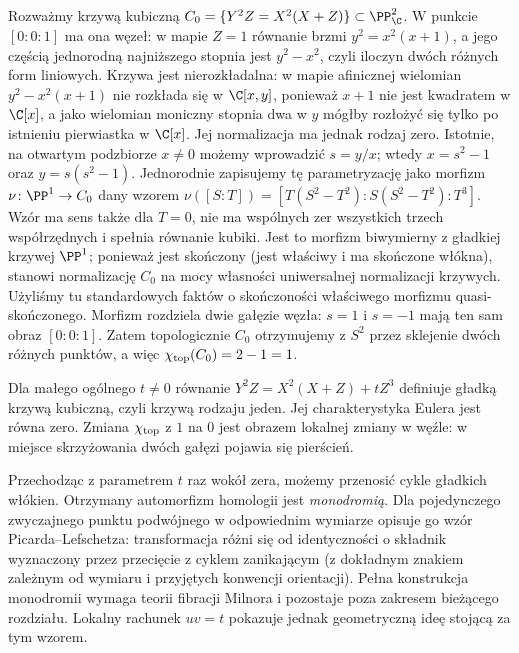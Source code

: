 \begin{przyklad}
Rozważmy krzywą kubiczną
$C_0=\{Y^2Z=X^2(X+Z)\}\subset\PP^2_\C$.
W punkcie $[0:0:1]$ ma ona węzeł: w mapie $Z=1$
równanie brzmi $y^2=x^2(x+1)$, a jego częścią
jednorodną najniższego stopnia jest $y^2-x^2$,
czyli iloczyn dwóch różnych form liniowych.
Krzywa jest nierozkładalna: w mapie afinicznej wielomian
$y^2-x^2(x+1)$ nie rozkłada się w $\C[x,y]$, ponieważ
$x+1$ nie jest kwadratem w $\C[x]$, a jako wielomian
moniczny stopnia dwa w $y$ mógłby rozłożyć się tylko
po istnieniu pierwiastka w $\C[x]$.
Jej normalizacja ma jednak rodzaj zero. Istotnie, na otwartym podzbiorze
$x\ne0$ możemy wprowadzić $s=y/x$; wtedy
$x=s^2-1$ oraz $y=s(s^2-1)$.
Jednorodnie zapisujemy tę parametryzację jako morfizm
$\nu\colon\PP^1\to C_0$ dany wzorem
$\nu([S:T])=[T(S^2-T^2):S(S^2-T^2):T^3]$.
Wzór ma sens także dla $T=0$, nie ma wspólnych zer wszystkich
trzech współrzędnych i spełnia równanie kubiki.
Jest to morfizm biwymierny z gładkiej krzywej $\PP^1$;
ponieważ jest skończony (jest właściwy i ma skończone włókna),
stanowi normalizację $C_0$ na mocy własności uniwersalnej
normalizacji krzywych. Użyliśmy tu standardowych faktów
o skończoności właściwego morfizmu quasi-skończonego.
Morfizm rozdziela dwie gałęzie węzła:
$s=1$ i $s=-1$ mają ten sam obraz $[0:0:1]$.
Zatem topologicznie $C_0$ otrzymujemy z $S^2$
przez sklejenie dwóch różnych punktów, a więc
$\chi_{\rm top}(C_0)=2-1=1$.

Dla małego ogólnego $t\ne0$ równanie
$Y^2Z=X^2(X+Z)+tZ^3$ definiuje gładką
krzywą kubiczną, czyli krzywą rodzaju jeden.
Jej charakterystyka Eulera jest równa zero.
Zmiana $\chi_{\rm top}$ z $1$ na $0$ jest
obrazem lokalnej zmiany w węźle: w miejsce
skrzyżowania dwóch gałęzi pojawia się pierścień.
\end{przyklad}

\begin{uwaga}
Przechodząc z parametrem $t$ raz wokół zera,
możemy przenosić cykle gładkich włókien.
Otrzymany automorfizm homologii jest \emph{monodromią}.
Dla pojedynczego zwyczajnego punktu podwójnego
w odpowiednim wymiarze opisuje go wzór Picarda--Lefschetza:
transformacja różni się od identyczności o składnik
wyznaczony przez przecięcie z cyklem zanikającym
(z dokładnym znakiem zależnym od wymiaru i przyjętych
konwencji orientacji). Pełna konstrukcja monodromii
wymaga teorii fibracji Milnora i pozostaje poza
zakresem bieżącego rozdziału. Lokalny rachunek $uv=t$
pokazuje jednak geometryczną ideę stojącą za tym wzorem.
\end{uwaga}

